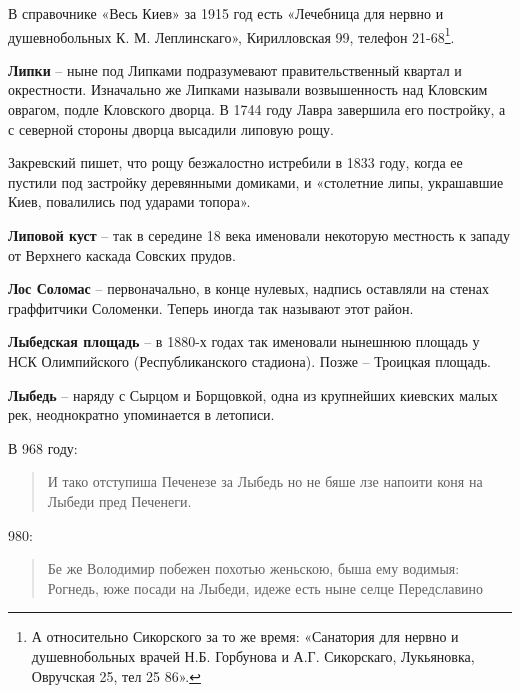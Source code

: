В справочнике «Весь Киев» за 1915 год есть «Лечебница для нервно и душевнобольных К. М. Леплинскаго», Кирилловская 99, телефон 21-68\footnote{А относительно Сикорского за то же время: «Санатория для нервно и душевнобольных врачей Н.Б. Горбунова и А.Г. Сикорскаго, Лукьяновка, Овручская 25, тел 25 86».}.\\

\medskip

\textbf{Липки} – ныне под Липками подразумевают правительственный квартал и окрестности. Изначально же Липками называли возвышенность над Кловским оврагом, подле Кловского дворца. В 1744 году Лавра завершила его постройку, а с северной стороны дворца высадили липовую рощу.

Закревский пишет, что рощу безжалостно истребили в 1833 году, когда ее пустили под застройку деревянными домиками, и «столетние липы, украшавшие Киев, повалились под ударами топора».\\

\medskip


\textbf{Липовой куст} – так в середине 18 века именовали некоторую местность к западу от Верхнего каскада Совских прудов.\\

\medskip

\textbf{Лос Соломас} – первоначально, в конце нулевых, надпись оставляли на стенах граффитчики Соломенки. Теперь иногда так называют этот район.\\

\medskip

\textbf{Лыбедская площадь} – в 1880-х годах так именовали нынешнюю площадь у НСК Олимпийского (Республиканского стадиона). Позже – Троицкая площадь.\\

\medskip


\textbf{Лыбедь} – наряду с Сырцом и Борщовкой, одна из крупнейших киевских малых рек, неоднократно упоминается в летописи.

В 968 году:

\begin{quotation}
\noindent И тако отступиша Печенезе за Лыбедь но не бяше лзе напоити коня на Лыбеди пред Печенеги.
\end{quotation}

980:

\begin{quotation}
\noindent Бе же Володимир побежен похотью женьскою, быша ему водимыя: Рогнедь, юже посади на Лыбеди, идеже есть ныне селце Передславино
\end{quotation}

